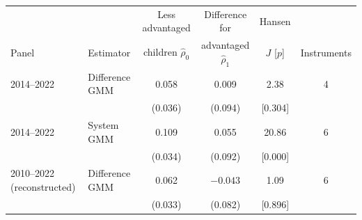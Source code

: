 \setlength{\tabcolsep}{3pt}
\begin{tabular}{@{}llcccc@{}}
\toprule
& & Less advantaged & Difference for & Hansen & \\
Panel & Estimator & children $\hat\rho_0$ & advantaged $\hat\rho_1$ & $J$ [$p$] & Instruments \\
\midrule
2014--2022 & Difference GMM & 0.058 & 0.009 & 2.38 & 4 \\
 &  & (0.036) & (0.094) & [0.304] &  \\
2014--2022 & System GMM & 0.109\rlap{***} & 0.055 & 20.86 & 6 \\
 &  & (0.034) & (0.092) & [0.000] &  \\
2010--2022 (reconstructed) & Difference GMM & 0.062\rlap{*} & $-0.043$ & 1.09 & 6 \\
 &  & (0.033) & (0.082) & [0.896] &  \\
\bottomrule
\end{tabular}
